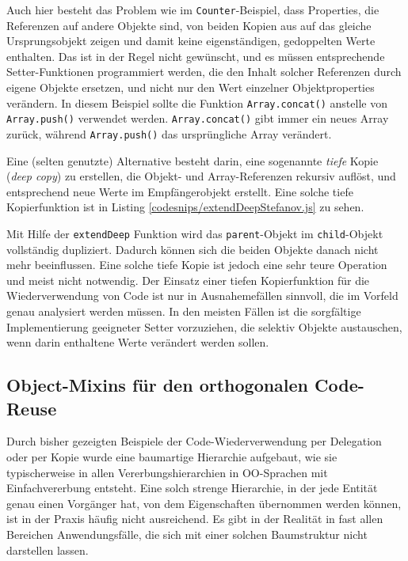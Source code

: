 
Auch hier besteht das Problem wie im \texttt{Counter}-Beispiel, dass Properties, die Referenzen auf andere Objekte sind, von beiden Kopien aus auf das gleiche Ursprungsobjekt zeigen und damit keine eigenständigen, gedoppelten Werte enthalten. 
Das ist in der Regel nicht gewünscht, und es müssen entsprechende Setter-Funktionen programmiert werden, die den Inhalt solcher Referenzen durch eigene Objekte ersetzen, und nicht nur den Wert einzelner Objektproperties verändern. In diesem Beispiel sollte die Funktion \texttt{Array.concat()} anstelle von \texttt{Array.push()} verwendet werden. \texttt{Array.concat()} gibt immer ein neues Array zurück, während \texttt{Array.push()} das ursprüngliche Array verändert.

Eine (selten genutzte) Alternative besteht darin, eine sogenannte \emph{tiefe} Kopie (\emph{deep copy}) zu erstellen, die Objekt- und Array-Referenzen rekursiv auflöst, und entsprechend neue Werte im Empfängerobjekt erstellt. Eine solche tiefe Kopierfunktion ist in Listing \ref{codesnips/extendDeepStefanov.js} zu sehen.


Mit Hilfe der \texttt{extendDeep} Funktion wird das \texttt{parent}-Objekt im \texttt{child}-Objekt vollständig dupliziert. Dadurch können sich die beiden Objekte danach nicht mehr beeinflussen. Eine solche tiefe Kopie ist jedoch eine sehr teure Operation und meist nicht notwendig. Der Einsatz einer tiefen Kopierfunktion für die Wiederverwendung von Code ist nur in Ausnahemefällen sinnvoll, die im Vorfeld genau analysiert werden müssen. In den meisten Fällen ist die sorgfältige Implementierung geeigneter Setter vorzuziehen, die selektiv Objekte austauschen, wenn darin enthaltene Werte verändert werden sollen.

\subsection{Object-Mixins für den orthogonalen Code-Reuse}
Durch bisher gezeigten Beispiele der Code-Wiederverwendung per Delegation oder per Kopie wurde eine baumartige Hierarchie aufgebaut, wie sie typischerweise in allen Vererbungshierarchien in OO-Sprachen mit Einfachvererbung entsteht. Eine solch strenge Hierarchie, in der jede Entität genau einen Vorgänger hat, von dem Eigenschaften übernommen werden können, ist in der Praxis häufig nicht ausreichend. Es gibt in der Realität in fast allen Bereichen Anwendungsfälle, die sich mit einer solchen Baumstruktur nicht darstellen lassen. %

